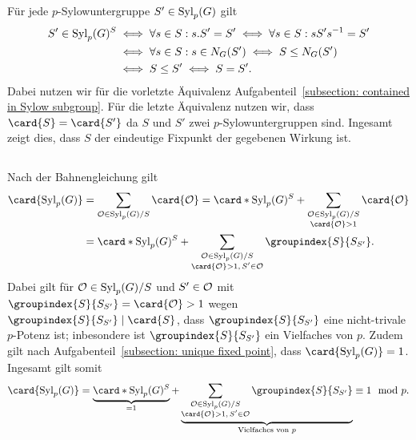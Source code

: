 Für jede $p$-Sylowuntergruppe $S' \in \Sylow{p}{G}$ gilt
\begin{align*}
        S' \in \Sylow{p}{G}^S
  &\iff \forall s \in S: s.S' = S'
   \iff \forall s \in S: s S' s^{-1} = S'
  \\
  &\iff \forall s \in S: s \in \normalizer{S'}{G}
   \iff S \subgroup \normalizer{S'}{G}
  \\
  &\iff S \subgroup S'
   \iff S = S'.
\end{align*}
Dabei nutzen wir für die vorletzte Äquivalenz Aufgabenteil~\ref{subsection: contained in Sylow subgroup}.
Für die letzte Äquivalenz nutzen wir, dass $\card{S} = \card{S'}$ da $S$ und $S'$ zwei $p$-Sylowuntergruppen sind.
Ingesamt zeigt dies, dass $S$ der eindeutige Fixpunkt der gegebenen Wirkung ist.





\subsection{}

Nach der Bahnengleichung gilt
\begin{align*}
      \card{\Sylow{p}{G}}
  &=  \sum_{\orbit \in \Sylow{p}{G}/S} \card{\orbit}
   =    \card*{\Sylow{p}{G}^S}
      + \sum_{\substack{\orbit \in \Sylow{p}{G}/S \\ \card{\orbit} > 1}}
        \card{\orbit}
  \\
  &=    \card*{\Sylow{p}{G}^S}
      + \sum_{\substack{\orbit \in \Sylow{p}{G}/S \\ \card{\orbit} > 1, \, S' \in \orbit}}
        \groupindex{S}{S_{S'}}.
\end{align*}
Dabei gilt für $\orbit \in \Sylow{p}{G}/S$ und $S' \in \orbit$ mit $\groupindex{S}{S_{S'}} = \card{\orbit} > 1$ wegen $\groupindex{S}{S_{S'}} \divides \card{S}$, dass $\groupindex{S}{S_{S'}}$ eine nicht-trivale $p$-Potenz ist;
inbesondere ist $\groupindex{S}{S_{S'}}$ ein Vielfaches von $p$.
Zudem gilt nach Aufgabenteil~\ref{subsection: unique fixed point}, dass $\card{\Sylow{p}{G}} = 1$.
Ingesamt gilt somit
\[
          \card{\Sylow{p}{G}}
  =       \underbrace{ \card*{\Sylow{p}{G}^S} }_{=1}
          + \underbrace{
            \sum_{\substack{\orbit \in \Sylow{p}{G}/S \\ \card{\orbit} > 1, \, S' \in \orbit}}
            \groupindex{S}{S_{S'}}
            }_{\text{Vielfaches von $p$}}
  \equiv  1
  \mod    p.
\]





\addtocounter{subsection}{1}
